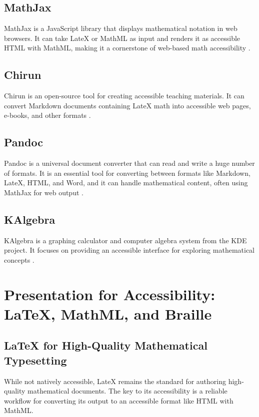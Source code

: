 \subsection{MathJax}\label{ch11:ssec:mathjax}
MathJax is a JavaScript library that displays mathematical notation in web browsers. It can take \gls{LateX} or \gls{MathML} as input and renders it as accessible HTML with \gls{MathML}, making it a cornerstone of web-based math accessibility \supercite{MathJax}.

\subsection{Chirun}\label{ch11:ssec:chirun}
Chirun is an open-source tool for creating accessible teaching materials. It can convert Markdown documents containing \gls{LateX} math into accessible web pages, e-books, and other formats \supercite{Chirun}.

\subsection{Pandoc}\label{ch11:ssec:pandoc}
Pandoc is a universal document converter that can read and write a huge number of formats. It is an essential tool for converting between formats like Markdown, \gls{LateX}, HTML, and Word, and it can handle mathematical content, often using MathJax for web output \supercite{Pandoc}.

\subsection{KAlgebra}\label{ch11:ssec:kalgebra}
KAlgebra is a graphing calculator and computer algebra system from the KDE project. It focuses on providing an accessible interface for exploring mathematical concepts \supercite{KAlgebra}.

\section{Presentation for Accessibility: LaTeX, MathML, and Braille}\label{ch11:sec:presentation}
\subsection{LaTeX for High-Quality Mathematical Typesetting}\label{ch11:ssec:latex}
While not natively accessible, \gls{LateX} remains the standard for authoring high-quality mathematical documents. The key to its accessibility is a reliable workflow for converting its output to an accessible format like HTML with \gls{MathML}.


